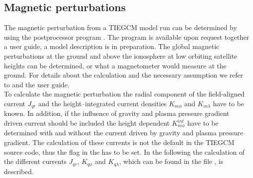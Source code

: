 %
\subsection{Magnetic perturbations}
%
The magnetic perturbation from a TIEGCM model run can be determined
by using the postprocessor program . The program is available
upon request together a  user guide, a model description
is in preparation. The global magnetic perturbations
at the ground and above the ionosphere at low orbiting satellite heights
can be determined, 
or what a magnetometer would measure at the ground. 
For details about the calculation and the
necessary assumption we refer to  \cite{rich74} and the 
 user guide. \\

%
To calculate the magnetic perturbation the radial component of the field-aligned current
$J_{qr}$ and the height--integrated current densities $K_{m \phi}$
and $K_{m \lambda}$ have to be known. In addition, if the influence of 
gravity and plasma
pressure gradient driven current
should be included the height dependent $K_{m \phi}^{int}$
have to be determined with and without the current driven by gravity and plasma
pressure gradient. The calculation of these currents
is not the default in the TIEGCM source code, thus the flag   
in the  has to be set. In the following the
calculation of the different currents $J_{qr}$, $K_{q \phi}$ and $K_{q \lambda}$, 
which can be found in the file , is described. 
%
